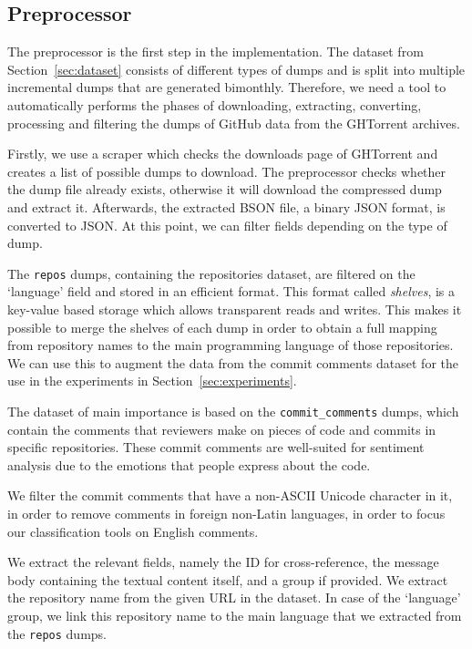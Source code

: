 \documentclass{article}
\begin{document}
\subsection{Preprocessor}\label{sec:preprocessor}

The preprocessor is the first step in the implementation. The dataset from 
Section~\ref{sec:dataset} consists of different types of dumps and is split 
into multiple incremental dumps that are generated bimonthly. Therefore, we 
need a tool to automatically performs the phases of downloading, extracting, 
converting, processing and filtering the dumps of GitHub data from the 
GHTorrent archives.

Firstly, we use a scraper which checks the downloads page of GHTorrent and 
creates a list of possible dumps to download. The preprocessor checks whether 
the dump file already exists, otherwise it will download the compressed dump 
and extract it. Afterwards, the extracted BSON file, a binary JSON format, is 
converted to JSON\@. At this point, we can filter fields depending on the type of 
dump.

The {\tt repos} dumps, containing the repositories dataset, are filtered on the 
`language' field and stored in an efficient format. This format called 
\emph{shelves}, is a key-value based storage which allows transparent reads and 
writes. This makes it possible to merge the shelves of each dump in order to 
obtain a full mapping from repository names to the main programming language of 
those repositories. We can use this to augment the data from the commit 
comments dataset for the use in the experiments in 
Section~\ref{sec:experiments}.

The dataset of main importance is based on the {\tt commit\_comments} dumps, 
which contain the comments that reviewers make on pieces of code and commits in 
specific repositories. These commit comments are well-suited for sentiment 
analysis due to the emotions that people express about the code. 

We filter the commit comments that have a non-ASCII Unicode character in it, in 
order to remove comments in foreign non-Latin languages, in order to focus our 
classification tools on English comments.

We extract the relevant fields, namely the ID for cross-reference, the message 
body containing the textual content itself, and a group if provided. We extract 
the repository name from the given URL in the dataset. In case of the 
`language' group, we link this repository name to the main language that we 
extracted from the {\tt repos} dumps.
\end{document}
